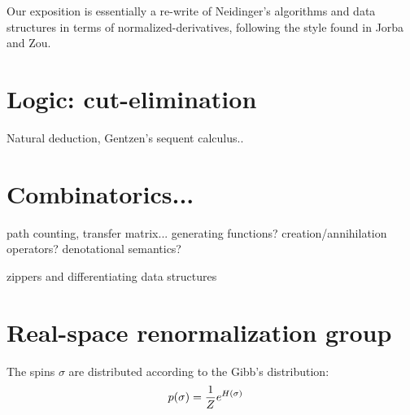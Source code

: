 \documentclass[11pt]{article}
\begin{document}
Our exposition is essentially a re-write of Neidinger's algorithms and
data structures in terms of normalized-derivatives, following the style found in Jorba and Zou. 


%
%

\section{Logic: cut-elimination}

Natural deduction, Gentzen's sequent calculus..

%
%

\section{Combinatorics...}

path counting, transfer matrix...
generating functions? 
creation/annihilation operators?
denotational semantics?

zippers and differentiating data structures



%
%

\section{Real-space renormalization group}


The spins $\sigma$ are distributed according
to the Gibb's distribution:
\begin{align*}
p(\sigma) &= {{1} \over {Z}}e^{H(\sigma)}
\end{align*}
\end{document}

